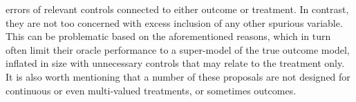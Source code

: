 \documentclass[12pt]{article}
\def\cred{\textcolor{red}}
\begin{document}
errors of relevant controls connected to either outcome or treatment. In contrast, they are not too concerned with excess inclusion of any other spurious variable. This can be problematic based on the aforementioned reasons, which in turn often limit their oracle performance to a super-model of the true outcome model, inflated in size with unnecessary controls that may relate to the treatment only. It is also worth mentioning that a number of these proposals are not designed for continuous or even multi-valued treatments, or sometimes outcomes.
% 
\end{document}
